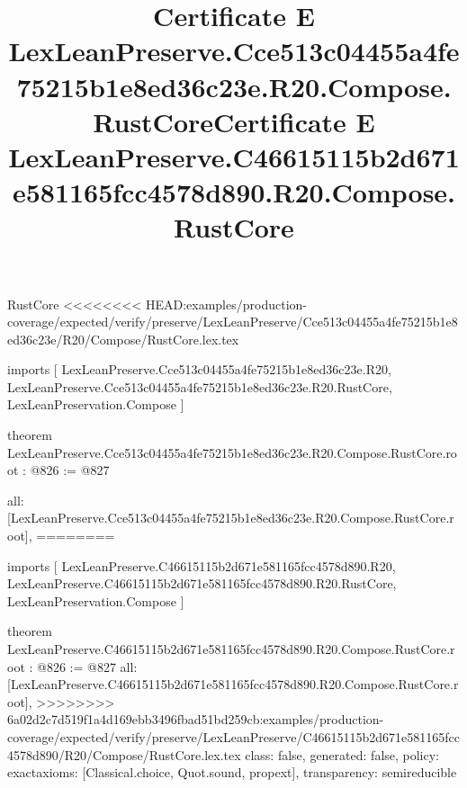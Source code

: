 \begin{lexlean}{RustCore}
<<<<<<<< HEAD:examples/production-coverage/expected/verify/preserve/LexLeanPreserve/Cce513c04455a4fe75215b1e8ed36c23e/R20/Compose/RustCore.lex.tex
\title{Certificate E LexLeanPreserve.Cce513c04455a4fe75215b1e8ed36c23e.R20.Compose.RustCore}
\begin{coremodule}
imports [
  LexLeanPreserve.Cce513c04455a4fe75215b1e8ed36c23e.R20,
  LexLeanPreserve.Cce513c04455a4fe75215b1e8ed36c23e.R20.RustCore,
  LexLeanPreservation.Compose
]

theorem LexLeanPreserve.Cce513c04455a4fe75215b1e8ed36c23e.R20.Compose.RustCore.root : @826 := @827 {
  all: [LexLeanPreserve.Cce513c04455a4fe75215b1e8ed36c23e.R20.Compose.RustCore.root],
========
\title{Certificate E LexLeanPreserve.C46615115b2d671e581165fcc4578d890.R20.Compose.RustCore}
\begin{coremodule}
imports [
  LexLeanPreserve.C46615115b2d671e581165fcc4578d890.R20,
  LexLeanPreserve.C46615115b2d671e581165fcc4578d890.R20.RustCore,
  LexLeanPreservation.Compose
]

theorem LexLeanPreserve.C46615115b2d671e581165fcc4578d890.R20.Compose.RustCore.root : @826 := @827 {
  all: [LexLeanPreserve.C46615115b2d671e581165fcc4578d890.R20.Compose.RustCore.root],
>>>>>>>> 6a02d2c7d519f1a4d169ebb3496fbad51bd259cb:examples/production-coverage/expected/verify/preserve/LexLeanPreserve/C46615115b2d671e581165fcc4578d890/R20/Compose/RustCore.lex.tex
  class: false,
  generated: false,
  policy: exact{axioms: [Classical.choice, Quot.sound, propext]},
  transparency: semireducible
}


\end{coremodule}}
\end{coremodule}
\end{lexlean}

